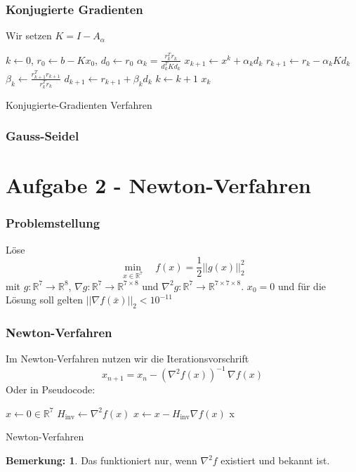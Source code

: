 \documentclass[xcolor = dvipsnames, notheorems, 10pt]{beamer}
\newcommand{\vth}{\vspace{4pt}}
\theoremstyle{definition}
\newtheorem{remark}		{Bemerkung:\vth}
\begin{document}
\begin{frame}
\frametitle{Konjugierte Gradienten}
	Wir setzen $K = I-A_\alpha$
	\begin{algorithm}[H]
		\begin{algorithmic}[1]
			\STATE $k \gets 0$, $r_0 \gets b-Kx_0$, $d_0 \gets r_0$
				\STATE $\alpha_k = \frac{r_k^T r_k}{d_k^T K d_k}$
				\STATE $x_{k+1} \gets x^k + \alpha_k d_k$
				\STATE $r_{k+1} \gets r_k - \alpha_k K d_k$
				\STATE $\beta_k \gets \frac{r_{k+1}^T r_{k+1}}{r_k^T r_k}$
				\STATE $d_{k+1} \gets r_{k+1} + \beta_k d_k$
				\STATE $k \gets k+1$
			\ENDWHILE
			\RETURN $x_k$
		\end{algorithmic}
		\caption{Konjugierte-Gradienten Verfahren}
	\end{algorithm}
\end{frame}

\begin{frame}
\frametitle{Gauss-Seidel}

\end{frame}

\section{Aufgabe 2 - Newton-Verfahren}
\begin{frame}
\frametitle{Problemstellung}
	Löse
		$$\min_{x \in \mathbb{R}^7} \quad f(x) = \frac{1}{2}||g(x)||_2^2$$
	mit $g: \mathbb{R}^7 \rightarrow \mathbb{R}^8$, $\nabla g: \mathbb{R}^7 \rightarrow \mathbb{R}^{7 \times 8}$ und $\nabla^2 g: \mathbb{R}^7 \rightarrow \mathbb{R}^{7 \times 7 \times 8}$. $x_0 = 0$ und für die Lösung soll gelten $||\nabla f(\bar x)||_2 < 10^{-11}$
	\vfill
\end{frame}

\begin{frame}
\frametitle{Newton-Verfahren}
	Im Newton-Verfahren nutzen wir die Iterationsvorschrift
	$$x_{n+1} = x_n - (\nabla^2 f(x))^{-1}\, \nabla f(x)$$
	Oder in Pseudocode:
	\begin{algorithm}[H]
		\begin{algorithmic}[1]
			\STATE $x \gets 0 \in \mathbb{R}^7$
				\STATE $H_\text{inv} \gets \nabla^2 f(x)$
				\STATE $x \gets x - H_\text{inv}\nabla f(x)$ 
			\ENDWHILE
			\RETURN x
		\end{algorithmic}
		\caption{Newton-Verfahren}
	\end{algorithm}
	\begin{remark}
		Das funktioniert nur, wenn $\nabla^2 f$ existiert und bekannt ist.
	\end{remark}
\end{frame}
\end{document}
